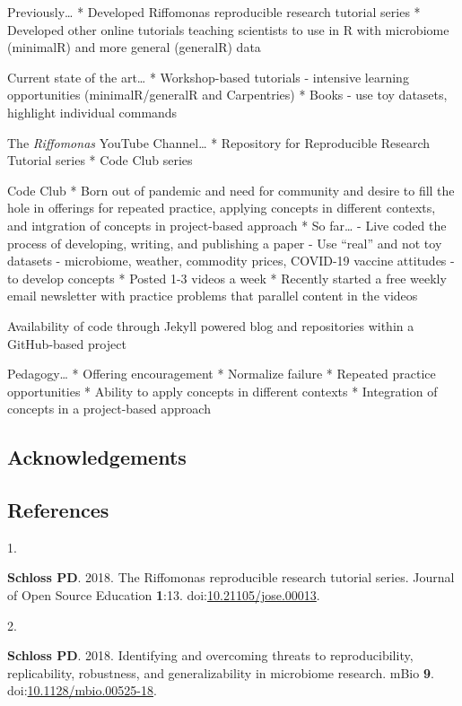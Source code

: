 \documentclass[
]{article}
\newlength{\cslhangindent}
\newlength{\csllabelwidth}
\newlength{\cslentryspacingunit} %
\newenvironment{CSLReferences}[2] %
 {%
  \setlength{\parindent}{0pt}
  \ifodd #1
  \let\oldpar\par
  \def\par{\hangindent=\cslhangindent\oldpar}
  \fi
  \setlength{\parskip}{#2\cslentryspacingunit}
 }%
 {}
\newcommand{\CSLLeftMargin}[1]{\parbox[t]{\csllabelwidth}{#1}}
\newcommand{\CSLRightInline}[1]{\parbox[t]{\linewidth - \csllabelwidth}{#1}\break}
\begin{document}
Previously\ldots{} * Developed Riffomonas reproducible research tutorial
series * Developed other online tutorials teaching scientists to use in
R with microbiome (minimalR) and more general (generalR) data

Current state of the art\ldots{} * Workshop-based tutorials - intensive
learning opportunities (minimalR/generalR and Carpentries) * Books - use
toy datasets, highlight individual commands

The \emph{Riffomonas} YouTube Channel\ldots{} * Repository for
Reproducible Research Tutorial series * Code Club series

Code Club * Born out of pandemic and need for community and desire to
fill the hole in offerings for repeated practice, applying concepts in
different contexts, and intgration of concepts in project-based approach
* So far\ldots{} - Live coded the process of developing, writing, and
publishing a paper - Use ``real'' and not toy datasets - microbiome,
weather, commodity prices, COVID-19 vaccine attitudes - to develop
concepts * Posted 1-3 videos a week * Recently started a free weekly
email newsletter with practice problems that parallel content in the
videos

Availability of code through Jekyll powered blog and repositories within
a GitHub-based project

Pedagogy\ldots{} * Offering encouragement * Normalize failure * Repeated
practice opportunities * Ability to apply concepts in different contexts
* Integration of concepts in a project-based approach

\hypertarget{acknowledgements}{%
\subsection{Acknowledgements}\label{acknowledgements}}

\newpage

\hypertarget{references}{%
\subsection{References}\label{references}}

\hypertarget{refs}{}
\begin{CSLReferences}{0}{1}
\leavevmode{}%
\CSLLeftMargin{1. }%
\CSLRightInline{\textbf{Schloss PD}. 2018. The {R}iffomonas reproducible
research tutorial series. Journal of Open Source Education
\textbf{1}:13.
doi:\href{https://doi.org/10.21105/jose.00013}{10.21105/jose.00013}.}

\leavevmode{}%
\CSLLeftMargin{2. }%
\CSLRightInline{\textbf{Schloss PD}. 2018. Identifying and overcoming
threats to reproducibility, replicability, robustness, and
generalizability in microbiome research. {mBio} \textbf{9}.
doi:\href{https://doi.org/10.1128/mbio.00525-18}{10.1128/mbio.00525-18}.}

\end{CSLReferences}
\end{document}
